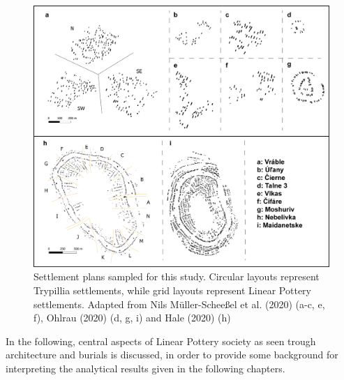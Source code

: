 \documentclass[
  12pt,
  a4paper, twoside]{book}
\begin{document}
\begin{figure}

{\centering \includegraphics[width=0.9\linewidth]{Results/fig03_plans} 

}

\caption[Sampled settlement plans]{Settlement plans sampled for this study. Circular layouts represent Trypillia settlements, while grid layouts represent Linear Pottery settlements. Adapted from Nils Müller-Scheeßel et al. (2020) (a-c, e, f), Ohlrau (2020) (d, g, i) and Hale (2020) (h)}\label{fig:03-plans}
\end{figure}

In the following, central aspects of Linear Pottery society as seen trough architecture and burials is discussed, in order to provide some background for interpreting the analytical results given in the following chapters.
\end{document}
